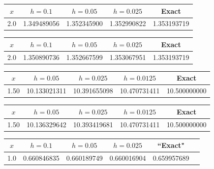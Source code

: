 {\small
{}
\begin{tabular}{|c|r|r|r|r|}\hline
\multicolumn{1}{|c|}{$x$}&
\multicolumn{1}{|c|}{$h=0.1$}&
\multicolumn{1}{|c|}{$h=0.05$}&
\multicolumn{1}{|c|}{$h=0.025$}&
\multicolumn{1}{|c|}{Exact}\\ \hline
2.0 & 1.349489056 & 1.352345900 & 1.352990822 & 1.353193719\\
\hline
\end{tabular}}

\bigskip

{\small
{}
\begin{tabular}{|c|r|r|r|r|}\hline
\multicolumn{1}{|c|}{$x$}&
\multicolumn{1}{|c|}{$h=0.1$}&
\multicolumn{1}{|c|}{$h=0.05$}&
\multicolumn{1}{|c|}{$h=0.025$}&
\multicolumn{1}{|c|}{Exact}\\ \hline
2.0 & 1.350890736 & 1.352667599 & 1.353067951 & 1.353193719\\
\hline
\end{tabular}}

\bigskip

{\small
{}
\begin{tabular}{|c|r|r|r|r|}\hline
\multicolumn{1}{|c|}{$x$}&
\multicolumn{1}{|c|}{$h=0.05$}&
\multicolumn{1}{|c|}{$h=0.025$}&
\multicolumn{1}{|c|}{$h=0.0125$}&
\multicolumn{1}{|c|}{Exact}\\ \hline
1.50 & 10.133021311 & 10.391655098 & 10.470731411 & 10.500000000 \\
\hline
\end{tabular}}

\bigskip

{\small
{}
\begin{tabular}{|c|r|r|r|r|}\hline
\multicolumn{1}{|c|}{$x$}&
\multicolumn{1}{|c|}{$h=0.05$}&
\multicolumn{1}{|c|}{$h=0.025$}&
\multicolumn{1}{|c|}{$h=0.0125$}&
\multicolumn{1}{|c|}{Exact}\\ \hline
1.50 & 10.136329642 & 10.393419681 & 10.470731411 & 10.500000000 \\
\hline
\end{tabular}}

\bigskip

{\small
{}
\begin{tabular}{|c|r|r|r|r|r|}
\hline
\multicolumn{1}{|c|}{$x$}&
\multicolumn{1}{|c|}{$h=0.1$}&
\multicolumn{1}{|c|}{$h=0.05$}&
\multicolumn{1}{|c|}{$h=0.025$}&
\multicolumn{1}{|c|}{``Exact"}\\ \hline
1.0 & 0.660846835 & 0.660189749 & 0.660016904 & 0.659957689 \\
\hline
\end{tabular}}

